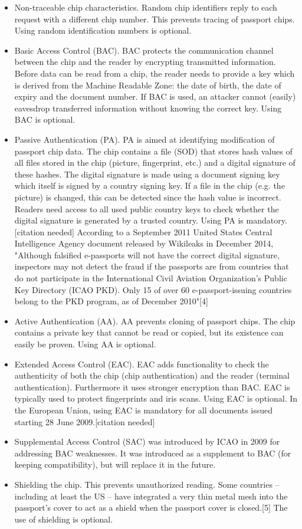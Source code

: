 \begin{itemize}
	\item Non-traceable chip characteristics. Random chip identifiers reply to each request with a different chip number. This prevents tracing of passport chips. Using random identification numbers is optional.
  \item Basic Access Control (BAC). BAC protects the communication channel between the chip and the reader by encrypting transmitted information. Before data can be read from a chip, the reader needs to provide a key which is derived from the Machine Readable Zone: the date of birth, the date of expiry and the document number. If BAC is used, an attacker cannot (easily) eavesdrop transferred information without knowing the correct key. Using BAC is optional.
  \item Passive Authentication (PA). PA is aimed at identifying modification of passport chip data. The chip contains a file (SOD) that stores hash values of all files stored in the chip (picture, fingerprint, etc.) and a digital signature of these hashes. The digital signature is made using a document signing key which itself is signed by a country signing key. If a file in the chip (e.g. the picture) is changed, this can be detected since the hash value is incorrect. Readers need access to all used public country keys to check whether the digital signature is generated by a trusted country. Using PA is mandatory.[citation needed] According to a September 2011 United States Central Intelligence Agency document released by Wikileaks in December 2014, "Although falsified e-passports will not have the correct digital signature, inspectors may not detect the fraud if the passports are from countries that do not participate in the International Civil Aviation Organization’s Public Key Directory (ICAO PKD). Only 15 of over 60 e-passport-issuing countries belong to the PKD program, as of December 2010"[4]
  \item Active Authentication (AA). AA prevents cloning of passport chips. The chip contains a private key that cannot be read or copied, but its existence can easily be proven. Using AA is optional.
  \item Extended Access Control (EAC). EAC adds functionality to check the authenticity of both the chip (chip authentication) and the reader (terminal authentication). Furthermore it uses stronger encryption than BAC. EAC is typically used to protect fingerprints and iris scans. Using EAC is optional. In the European Union, using EAC is mandatory for all documents issued starting 28 June 2009.[citation needed]
  \item Supplemental Access Control (SAC) was introduced by ICAO in 2009 for addressing BAC weaknesses. It was introduced as a supplement to BAC (for keeping compatibility), but will replace it in the future.
  \item Shielding the chip. This prevents unauthorized reading. Some countries – including at least the US – have integrated a very thin metal mesh into the passport's cover to act as a shield when the passport cover is closed.[5] The use of shielding is optional.
\end{itemize}


